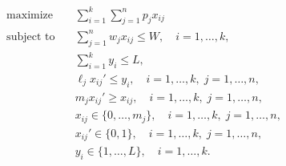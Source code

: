 \begin{align}
\text{maximize} \quad & \sum_{i=1}^k \sum_{j = 1}^n p_{j} x_{ij} \\
\text{subject to} \quad & \sum_{j=1}^n w_{j} x_{ij} \leq W, \quad i = 1, \ldots, k, \\
& \sum_{i=1}^k y_i \leq L, \\
& \ell_j x_{ij}' \leq y_i, \quad i = 1, \ldots, k, \; j = 1, \ldots, n, \\
& m_j x_{ij}' \geq x_{ij}, \quad i = 1, \ldots, k, \; j = 1, \ldots, n, \\
& x_{ij} \in \lbrace 0, \ldots, m_j \rbrace , \quad i = 1, \ldots, k, \; j = 1, \ldots, n, \\
& x_{ij}' \in \lbrace 0, 1 \rbrace , \quad i = 1, \ldots, k, \; j = 1, \ldots, n, \\
& y_i \in \lbrace 1, \ldots, L \rbrace , \quad i = 1, \ldots, k.
\end{align} 
